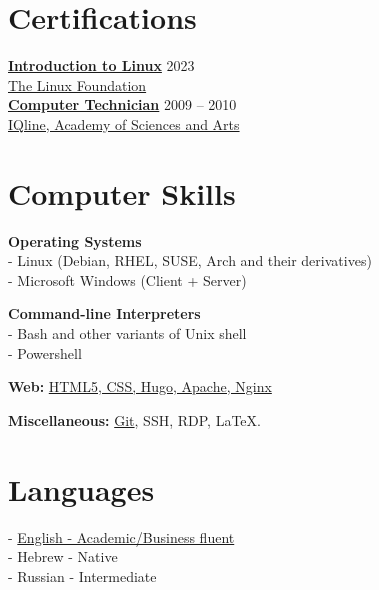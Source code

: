 \documentclass[
	12pt,a4paper %
]{article}
\begin{document}
\begin{paracol}{2} %

\section{Certifications}

\href{https://courses.edx.org/certificates/dc4f0cd758304785a2ea62cca29e6a86}{\textbf{Introduction to Linux}} \hfill 2023 \\
\href{https://courses.edx.org/certificates/dc4f0cd758304785a2ea62cca29e6a86}{The Linux Foundation} \\
\href{https://loona-il.000webhostapp.com/resume-references/computer-technitian-certificate.jpg}{\textbf{Computer Technician}} \hfill 2009 -- 2010 \\
\href{https://loona-il.000webhostapp.com/resume-references/computer-technitian-certificate.jpg}{IQline, Academy of Sciences and Arts}

\section{Computer Skills}

\textbf{Operating Systems} \\
 - Linux (Debian, RHEL, SUSE, Arch and their derivatives)\\
 - Microsoft Windows (Client + Server)

\textbf{Command-line Interpreters} \\
- Bash and other variants of Unix shell \\
- Powershell

\textbf{Web:} \href{https://kiril-u.github.io/resume/}{HTML5, CSS, Hugo, Apache, Nginx}


\textbf{Miscellaneous:} \href{https://github.com/kiril-u}{Git}, SSH, RDP, \LaTeX.

\switchcolumn

\section{Languages}
 - \href{https://loona-il.000webhostapp.com/resume-references/English-Skill.png}{English - Academic/Business fluent} \\
 - Hebrew - Native \\
 - Russian - Intermediate

\end{paracol}
\end{document}
